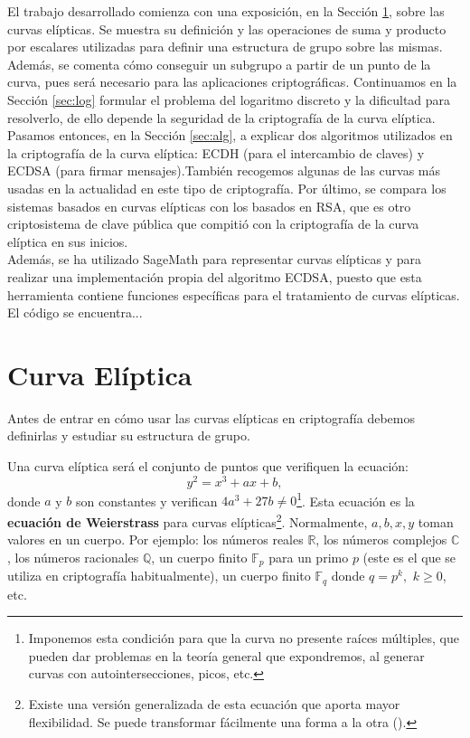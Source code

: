 \documentclass[11pt]{article}
\begin{document}
El trabajo desarrollado comienza con una exposición, en la Sección \ref{sec:curva}, sobre las curvas elípticas. Se muestra su definición y las operaciones de suma y producto por escalares utilizadas para definir una estructura de grupo sobre las mismas. Además, se comenta cómo conseguir un subgrupo a partir de un punto de la curva, pues será necesario para las aplicaciones criptográficas. Continuamos en la Sección \ref{sec:log} formular el problema del logaritmo discreto y la dificultad para resolverlo, de ello depende la seguridad de la criptografía de la curva elíptica. Pasamos entonces, en la Sección \ref{sec:alg}, a explicar dos algoritmos utilizados en la criptografía de la curva elíptica: ECDH (para el intercambio de claves) y ECDSA (para firmar mensajes).También recogemos algunas de las curvas más usadas en la actualidad en este tipo de criptografía.
Por último, se compara los sistemas basados en curvas elípticas con los basados en RSA, que es otro criptosistema de clave pública que compitió con la criptografía de la curva elíptica en sus inicios.\\

Además, se ha utilizado SageMath para representar curvas elípticas y para realizar una implementación propia del algoritmo ECDSA, puesto que esta herramienta contiene funciones específicas para el tratamiento de curvas elípticas. El código se encuentra...


\section{Curva Elíptica}
\label{sec:curva}
Antes de entrar en cómo usar las curvas elípticas en criptografía debemos definirlas y estudiar su estructura de grupo.

Una curva elíptica será el conjunto de puntos que verifiquen la ecuación:
\[y^2 = x^3 + ax + b,\]
donde $a$ y $b$ son constantes y verifican $4a^3+27b \neq 0$\footnote{Imponemos esta condición para que la curva no presente raíces múltiples, que pueden dar problemas en la teoría general que expondremos, al generar curvas con autointersecciones, picos, etc. }. Esta ecuación es la \textbf{ecuación de Weierstrass} para curvas elípticas\footnote{Existe una versión generalizada de esta ecuación que aporta mayor flexibilidad. Se puede transformar fácilmente una forma a la otra (\cite{washington_elliptic_2008}).}. Normalmente, $a, b, x, y$ toman valores en un cuerpo. Por ejemplo: los números reales $\mathbb{R}$, los números complejos $\mathbb{C}$, los números racionales $\mathbb{Q}$, un cuerpo finito $\mathbb{F}_p$ para un primo $p$ (este es el que se utiliza en criptografía habitualmente), un cuerpo finito $\mathbb{F}_q$ donde $q = p^k,$ $k \ge 0$, etc.
\end{document}
